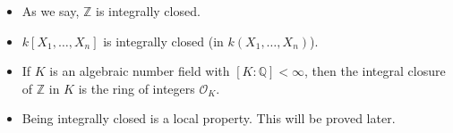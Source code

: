 \begin{itemize}
	\item  As we say, $\mathbb{Z}$ is integrally closed.
	\item $k[X_1, \ldots, X_n]$ is integrally closed (in $k(X_1, \ldots, X_n)$).
	\item If $K$ is an algebraic number field with $[K:\mathbb{Q}]<\infty$, then
		the integral closure of $\mathbb{Z}$ in $K$ is the ring of integers
		$\mathcal{O}_K$.
	\item Being integrally closed is a local property. This will be proved later.
\end{itemize}
